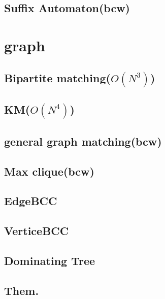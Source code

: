 \documentclass[12pt,twocolumn,oneside,a4paper]{article}
\begin{document}
\subsection{Suffix Automaton(bcw)}


\section{graph}
\subsection{Bipartite matching(\(O(N^3)\))}


\subsection{KM(\(O(N^4)\))}


\subsection{general graph matching(bcw)}


\subsection{Max clique(bcw)}


\subsection{EdgeBCC}


\subsection{VerticeBCC}


\subsection{Dominating Tree}


\subsection{Them.}

\end{document}
